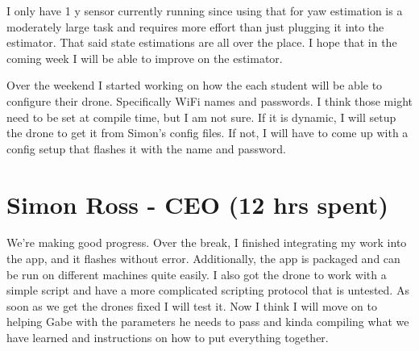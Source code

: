 \documentclass[12pt, titlepage]{article}
\begin{document}
I only have 1 y sensor currently running since using that for yaw estimation is a moderately large task and requires more effort than just plugging it into the estimator. That said state estimations are all over the place. I hope that in the coming week I will be able to improve on the estimator.

Over the weekend I started working on how the each student will be able to configure their drone. Specifically WiFi names and passwords. I think those might need to be set at compile time, but I am not sure. If it is dynamic, I will setup the drone to get it from Simon's config files. If not, I will have to come up with a config setup that flashes it with the name and password.

\section*{Simon Ross - CEO (12 hrs spent)}

We're making good progress. Over the break, I finished integrating my work into the app, and it flashes without error. Additionally, the app is packaged and can be run on different machines quite easily. I also got the drone to work with a simple script and have a more complicated scripting protocol that is untested. As soon as we get the drones fixed I will test it. Now I think I will move on to helping Gabe with the parameters he needs to pass and kinda compiling what we have learned and instructions on how to put everything together.
\end{document}
